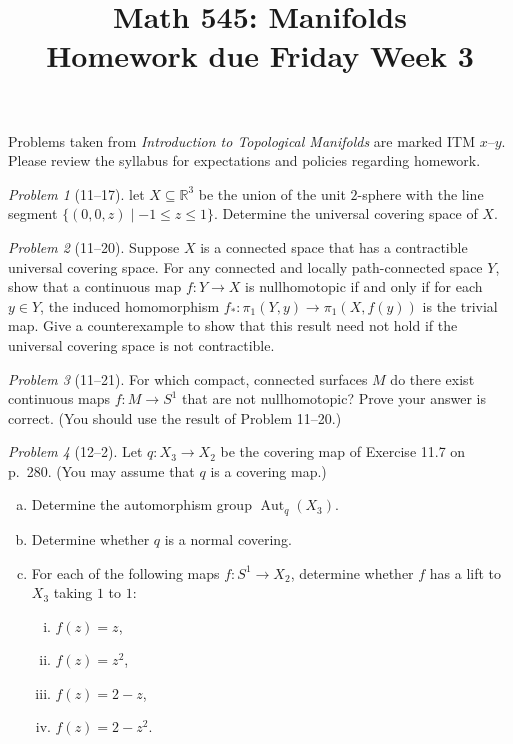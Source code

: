 \documentclass[11pt,twoside]{amsart}
\title{Math 545: Manifolds\\ Homework due Friday Week 3}
\theoremstyle{plain}
\theoremstyle{remark}
\newtheorem{prob}{Problem}
\theoremstyle{definition}
\theoremstyle{definition}
\newcommand{\RR}{\mathbb{R}}
\newcommand{\Aut}{\operatorname{Aut}}
\begin{document}
\maketitle

\noindent Problems taken from \emph{Introduction to Topological Manifolds} are marked ITM $x$--$y$. Please review the syllabus for expectations and policies regarding homework.

\begin{prob}[11--17]
let $X\subseteq \RR^3$ be the union of the unit $2$-sphere with the line segment $\{(0,0,z)\mid -1\le z\le 1\}$. Determine the universal covering space of $X$.
\end{prob}

\begin{prob}[11--20]
Suppose $X$ is a connected space that has a contractible universal covering space. For any connected and locally path-connected space $Y$, show that a continuous map $f\colon Y\to X$ is nullhomotopic if and only if for each $y\in Y$, the induced homomorphism $f_*\colon \pi_1(Y,y)\to \pi_1(X,f(y))$ is the trivial map. Give a counterexample to show that this result need not hold if the universal covering space is not contractible.
\end{prob}

\begin{prob}[11--21]
For which compact, connected surfaces $M$ do there exist continuous maps $f\colon M\to S^1$ that are not nullhomotopic? Prove your answer is correct. (You should use the result of Problem 11--20.)
\end{prob}

\begin{prob}[12--2]
Let $q\colon X_3\to X_2$ be the covering map of Exercise 11.7 on p.~280. (You may assume that $q$ is a covering map.) 
\begin{enumerate}[(a)]
\item Determine the automorphism group $\Aut_q(X_3)$.
\item Determine whether $q$ is a normal covering.
\item For each of the following maps $f\colon S^1\to X_2$, determine whether $f$ has a lift to $X_3$ taking $1$ to $1$:
\begin{enumerate}[(i)]
\item $f(z)=z$,
\item $f(z)=z^2$,
\item $f(z)=2-z$,
\item $f(z)=2-z^2$.
\end{enumerate}
\end{enumerate}
\end{prob}
\end{document}
